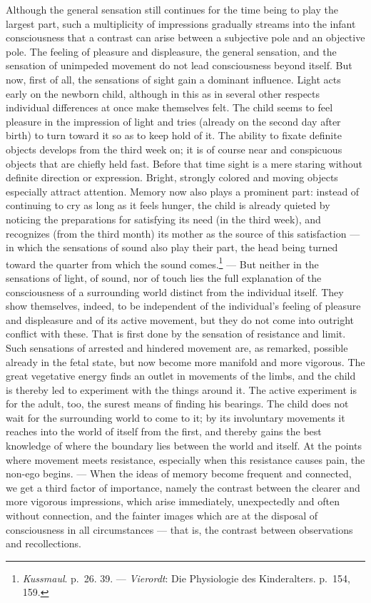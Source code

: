 \documentclass[12pt,a4paper]{book}
\newcommand{\opage}[1]{\marginnote{\footnotesize\textit{[#1]}}}
\begin{document}
Although the general sensation still continues for the time being to
play the largest part, such a multiplicity of impressions gradually
streams into the infant consciousness that a contrast can arise between
a subjective pole and an objective pole. The feeling of pleasure and
displeasure, the general sensation, and the sensation of unimpeded
movement do not lead consciousness beyond itself. But now, first of
all, the sensations of sight gain a dominant influence. Light acts early
on the newborn child, although in this as in several other respects
individual differences at once make themselves felt. The child seems to
feel pleasure in the impression of light and tries (already on the
second day after birth) to turn toward it so as to keep hold of it. The
ability to fixate definite objects develops from the third week on; it
is of course near and conspicuous objects that are chiefly held fast.
Before that time
\opage{5}sight is a mere staring without definite direction or
expression. Bright, strongly colored and moving objects especially
attract attention. Memory now also plays a prominent part: instead of
continuing to cry as long as it feels hunger, the child is already
quieted by noticing the preparations for satisfying its need (in the
third week), and recognizes (from the third month) its mother as the
source of this satisfaction --- in which the sensations of sound also
play their part, the head being turned toward the quarter from which the
sound comes.\footnote{\emph{Kussmaul}. p.~26. 39. --- \emph{Vierordt}:
Die Physiologie des Kinderalters. p.~154, 159.} --- But neither in the
sensations of light, of sound, nor of touch lies the full explanation of
the consciousness of a surrounding world distinct from the individual
itself. They show themselves, indeed, to be independent of the
individual's feeling of pleasure and displeasure and of its active
movement, but they do not come into outright conflict with these. That
is first done by the sensation of resistance and limit. Such sensations
of arrested and hindered movement are, as remarked, possible already in
the fetal state, but now become more manifold and more vigorous. The
great vegetative energy finds an outlet in movements of the limbs, and
the child is thereby led to experiment with the things around it. The
active experiment is for the adult, too, the surest means of finding his
bearings. The child does not wait for the surrounding world to come to
it; by its involuntary movements it reaches into the world of itself
from the first, and thereby gains the best knowledge of where the
boundary lies between the world and itself. At the points where movement
meets resistance, especially when this resistance causes pain, the
non-ego begins. --- When the ideas of memory become frequent and
connected, we get a third factor of importance, namely the contrast
between the clearer and more vigorous impressions, which arise
immediately, unexpectedly and often without connection, and the fainter
images which are at the disposal of consciousness in all circumstances
--- that is, the contrast between observations and recollections.
\end{document}
